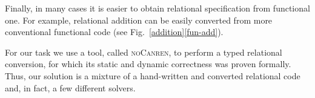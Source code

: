 Finally, in many cases it is easier to obtain relational specification from functional one. For example,
relational addition can be easily converted from more conventional functional code (see Fig.~\ref{addition}\ref{fun-add}).

For our task we use a tool, called \textsc{noCanren}, to perform a typed relational conversion\cite{lozov2017typed}, for which its static and dynamic
correctness was proven formally. Thus, our solution is a mixture of a hand-written and converted relational code and, in fact, a few
different solvers.


